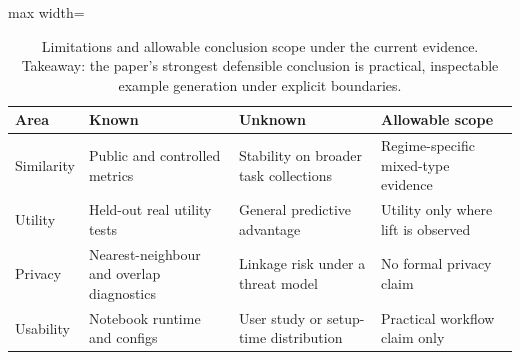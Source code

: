 \begin{table}
\caption{Limitations and allowable conclusion scope under the current evidence. Takeaway: the paper's strongest defensible conclusion is practical, inspectable example generation under explicit boundaries.}
\label{tab:limitations-scope}
\begin{adjustbox}{max width=\textwidth}
\begin{tabular}{llll}
\toprule
Area & Known & Unknown & Allowable scope \\
\midrule
Similarity & Public and controlled metrics & Stability on broader task collections & Regime-specific mixed-type evidence \\
Utility & Held-out real utility tests & General predictive advantage & Utility only where lift is observed \\
Privacy & Nearest-neighbour and overlap diagnostics & Linkage risk under a threat model & No formal privacy claim \\
Usability & Notebook runtime and configs & User study or setup-time distribution & Practical workflow claim only \\
\bottomrule
\end{tabular}
\end{adjustbox}
\end{table}
